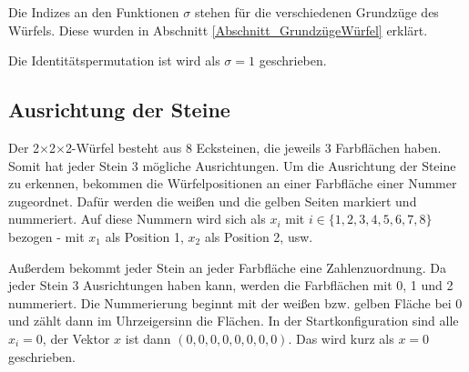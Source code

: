 \documentclass[12pt,a4paper, usenames, dvipsnames]{article}
\theoremstyle{mystyle}
\theoremstyle{definition}
\newcommand{\Ttwo}{2$\times$2$\times$2-}
\begin{document}
Die Indizes an den Funktionen $\sigma$ stehen für die verschiedenen Grundzüge des Würfels. Diese wurden in Abschnitt \ref{Abschnitt_GrundzügeWürfel} erklärt.

Die Identitätspermutation ist wird als $\sigma=1$ geschrieben.

%
%
%
%
%
%
%
%
%
%
%
%
%
%
%
%
%
%
%
%
\subsection{Ausrichtung der Steine} 
 \label{Abschnitt_AusrichtungDerSteine}
Der \Ttwo Würfel besteht aus 8 Ecksteinen, die jeweils 3 Farbflächen haben. Somit hat jeder Stein 3 mögliche Ausrichtungen. 
Um die Ausrichtung der Steine zu erkennen, bekommen die Würfelpositionen an einer Farbfläche einer Nummer zugeordnet. Dafür werden die weißen und die gelben Seiten markiert und nummeriert. Auf diese Nummern wird sich als $x_i$ mit $i \in \lbrace 1, 2, 3, 4, 5, 6, 7, 8 \rbrace$ bezogen - mit $x_1$ als Position 1, $x_2$ als Position 2, usw.

Außerdem bekommt jeder Stein an jeder Farbfläche eine Zahlenzuordnung. Da jeder Stein 3 Ausrichtungen haben kann, werden die Farbflächen mit 0, 1 und 2 nummeriert. Die Nummerierung beginnt mit der weißen bzw. gelben Fläche bei 0 und zählt dann im Uhrzeigersinn die Flächen. 
In der Startkonfiguration sind alle $x_i = 0$, der Vektor $x$ ist dann $(0, 0, 0, 0, 0, 0, 0, 0)$. Das wird kurz als $x=0$ geschrieben.
\end{document}
